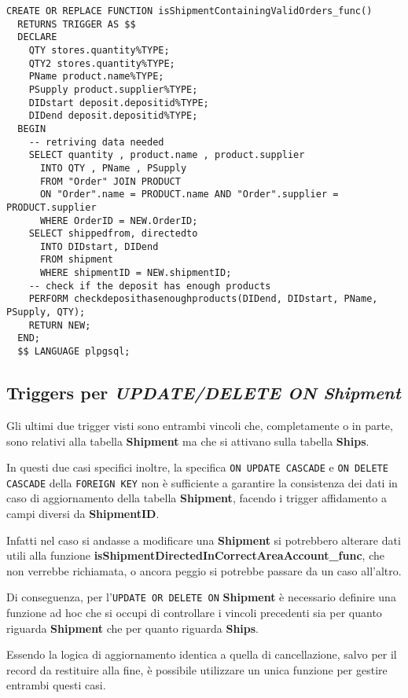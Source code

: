 \begin{lstlisting}[caption={Creazione funzione \textbf{isShipmentContainingValidOrders\_func}}]
  CREATE OR REPLACE FUNCTION isShipmentContainingValidOrders_func()
  RETURNS TRIGGER AS $$
  DECLARE
    QTY stores.quantity%TYPE;
    QTY2 stores.quantity%TYPE;
    PName product.name%TYPE;
    PSupply product.supplier%TYPE;
    DIDstart deposit.depositid%TYPE;
    DIDend deposit.depositid%TYPE;
  BEGIN
    -- retriving data needed
    SELECT quantity , product.name , product.supplier 
      INTO QTY , PName , PSupply
      FROM "Order" JOIN PRODUCT
      ON "Order".name = PRODUCT.name AND "Order".supplier = PRODUCT.supplier
      WHERE OrderID = NEW.OrderID;
    SELECT shippedfrom, directedto
      INTO DIDstart, DIDend
      FROM shipment
      WHERE shipmentID = NEW.shipmentID;
    -- check if the deposit has enough products
    PERFORM checkdeposithasenoughproducts(DIDend, DIDstart, PName, PSupply, QTY);
    RETURN NEW;
  END;
  $$ LANGUAGE plpgsql;
\end{lstlisting}

\subsection{Triggers per \textbf{\textit{UPDATE/DELETE ON Shipment}}}

Gli ultimi due trigger visti sono entrambi vincoli che, completamente o in parte, sono relativi alla tabella \textbf{Shipment} ma che si attivano sulla tabella \textbf{Ships}.

In questi due casi specifici inoltre, la specifica \lstinline{ON UPDATE CASCADE} e \lstinline{ON DELETE CASCADE} della \lstinline{FOREIGN KEY} non è sufficiente a garantire la consistenza dei dati in caso di aggiornamento della tabella \textbf{Shipment}, facendo i trigger affidamento a campi diversi da \textbf{ShipmentID}.

Infatti nel caso si andasse a modificare una \textbf{Shipment} si potrebbero alterare dati utili alla funzione \textbf{isShipmentDirectedInCorrectAreaAccount\_func}, che non verrebbe richiamata, o ancora peggio si potrebbe passare da un caso all'altro. 

Di conseguenza, per l'\lstinline{UPDATE OR DELETE ON} \textbf{Shipment} è necessario definire una funzione ad hoc che si occupi di controllare i vincoli precedenti sia per quanto riguarda \textbf{Shipment} che per quanto riguarda \textbf{Ships}.

Essendo la logica di aggiornamento identica a quella di cancellazione, salvo per il record da restituire alla fine, è possibile utilizzare un unica funzione per gestire entrambi questi casi.

